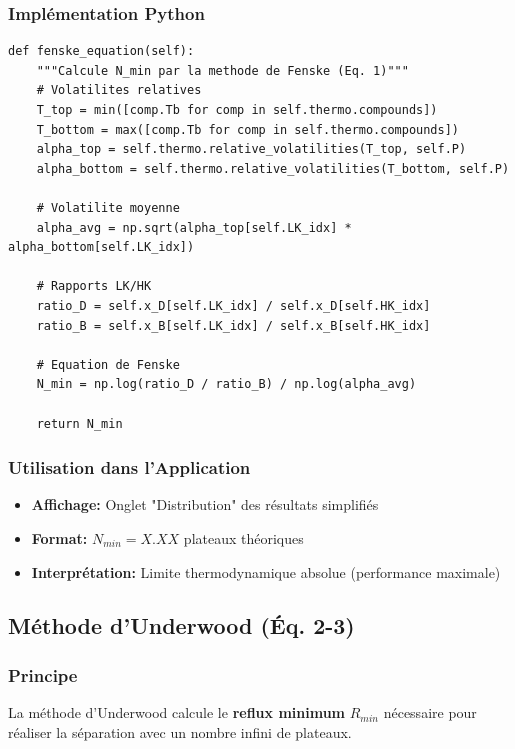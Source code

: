 \documentclass[11pt,a4paper]{article}
\begin{document}
\subsubsection{Implémentation Python}

\begin{lstlisting}[caption=Méthode de Fenske dans distillation\_multicomposants.py]
def fenske_equation(self):
    """Calcule N_min par la methode de Fenske (Eq. 1)"""
    # Volatilites relatives
    T_top = min([comp.Tb for comp in self.thermo.compounds])
    T_bottom = max([comp.Tb for comp in self.thermo.compounds])
    alpha_top = self.thermo.relative_volatilities(T_top, self.P)
    alpha_bottom = self.thermo.relative_volatilities(T_bottom, self.P)

    # Volatilite moyenne
    alpha_avg = np.sqrt(alpha_top[self.LK_idx] * alpha_bottom[self.LK_idx])

    # Rapports LK/HK
    ratio_D = self.x_D[self.LK_idx] / self.x_D[self.HK_idx]
    ratio_B = self.x_B[self.LK_idx] / self.x_B[self.HK_idx]

    # Equation de Fenske
    N_min = np.log(ratio_D / ratio_B) / np.log(alpha_avg)

    return N_min
\end{lstlisting}

\subsubsection{Utilisation dans l'Application}

\begin{itemize}[leftmargin=*]
    \item \textbf{Affichage:} Onglet "Distribution" des résultats simplifiés
    \item \textbf{Format:} $N_{min} = X.XX$ plateaux théoriques
    \item \textbf{Interprétation:} Limite thermodynamique absolue (performance maximale)
\end{itemize}

\subsection{Méthode d'Underwood (Éq. 2-3)}

\subsubsection{Principe}

La méthode d'Underwood calcule le \textbf{reflux minimum} $R_{min}$ nécessaire pour réaliser la séparation avec un nombre infini de plateaux.
\end{document}
